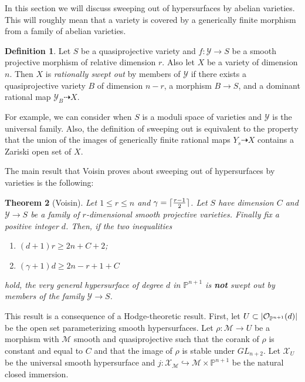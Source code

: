 \documentclass{amsart}
\DeclarePairedDelimiter{\ceil}{\lceil}{\rceil}
\newtheorem{thm}{Theorem}[section]
\theoremstyle{definition}
\newtheorem{defn}[thm]{Definition}
\theoremstyle{remark}
\theoremstyle{plain}
\theoremstyle{definition}
\theoremstyle{remark}
\renewcommand{\P}{\mathbb{P}}
\newcommand{\mc}[1]{\mathcal{#1}}
\newcommand{\1}{\mathbf{1}}
\newcommand{\2}{\mathbf{2}}
\newcommand{\3}{\mathbf{3}}
\begin{document}
In this section we will discuss sweeping out of hypersurfaces by abelian varieties. This will roughly mean that a variety is covered by a generically finite morphism from a family of abelian varieties.

\begin{defn}
    Let $S$ be a quasiprojective variety and $f \colon \mc{Y} \to S$ be a smooth projective morphism of relative dimension $r$. Also let $X$ be a variety of dimension $n$. Then $X$ is \textit{rationally swept out} by members of $\mc{Y}$ if there exists a quasiprojective variety $B$ of dimension $n-r$, a morphism $B \to S$, and a dominant rational map $\mc{Y}_B \dashrightarrow X$.
\end{defn}

For example, we can consider when $S$ is a moduli space of varieties and $\mc{Y}$ is the universal family. Also, the definition of sweeping out is equivalent to the property that the union of the images of generically finite rational maps $Y_s \dashrightarrow X$ contains a Zariski open set of $X$.

The main result that Voisin proves about sweeping out of hypersurfaces by varieties is the following:

\begin{thm}[Voisin]
    Let $1 \leq r \leq n$ and $\gamma = \ceil{\frac{r-1}{2}}$. Let $S$ have dimension $C$ and $\mc{Y} \to S$ be a family of $r$-dimensional smooth projective varieties. Finally fix a positive integer $d$. Then, if the two inequalities
    \begin{enumerate}
        \item $(d+1) r \geq 2n + C + 2$;
        \item $(\gamma + 1) d \geq 2n - r + 1 + C$
    \end{enumerate}
    hold, the very general hypersurface of degree $d$ in $\P^{n+1}$ is \textbf{not} swept out by members of the family $\mc{Y} \to S$.
\end{thm}

This result is a consequence of a Hodge-theoretic result. First, let $U \subset \abs{\mc{O}_{\P^{n+1}}(d)}$ be the open set parameterizing smooth hypersurfaces. Let $\rho \colon \mc{M} \to U$ be a morphism with $\mc{M}$ smooth and quasiprojective such that the corank of $\rho$ is constant and equal to $C$ and that the image of $\rho$ is stable under $GL_{n+2}$. Let $\mc{X}_U$ be the universal smooth hypersurface and $j \colon \mc{X}_{\mc{M}} \hookrightarrow \mc{M} \times \P^{n+1}$ be the natural closed immersion.
\end{document}

